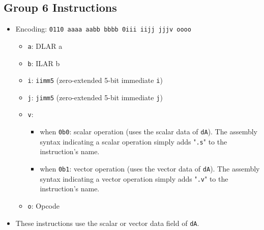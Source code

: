 \documentclass{article}
\begin{document}
	\subsection{Group 6 Instructions}
		\begin{itemize}
		\item Encoding:  \texttt{0110 aaaa aabb bbbb  0iii iijj jjjv oooo}
			\begin{itemize}
			\item \texttt{a}:  DLAR a
			\item \texttt{b}:  ILAR b
			\item \texttt{i}:  \texttt{iimm5} (zero-extended 5-bit
			immediate \texttt{i})
			\item \texttt{j}:  \texttt{jimm5} (zero-extended 5-bit
			immediate \texttt{j})
			\item \texttt{v}:
				\begin{itemize}
				\item when \texttt{0b0}:  scalar operation (uses the scalar
				data of \texttt{dA}).  The assembly syntax indicating a
				scalar operation simply adds "\texttt{.s}" to the
				instruction's name.
				\item when \texttt{0b1}:  vector operation (uses the vector
				data of \texttt{dA}).  The assembly syntax indicating a
				vector operation simply adds "\texttt{.v}" to the
				instruction's name.
				\end{itemize}
			\item \texttt{o}:  Opcode
			\end{itemize}

		\item These instructions use the scalar or vector data field of
		\texttt{dA}.


\end{itemize}
\end{document}
